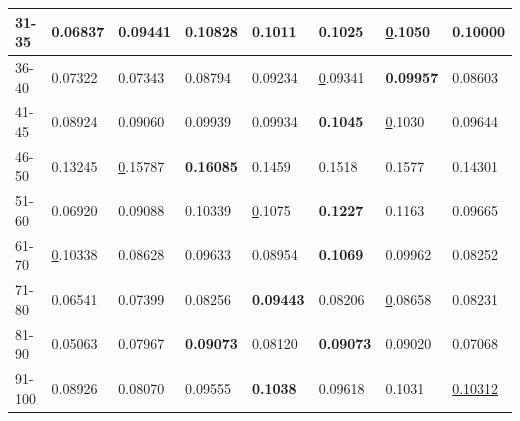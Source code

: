 \begin{table}[]
\begin{tabular}{|l|l|l|l|l|l|l||l|}
        31-35       & 0.06837                        & 0.09441                        & \textbf{0.10828}               & 0.1011                         & 0.1025                         & {\ul 0.1050}                    & 0.10000                    \\ \hline
        36-40       & 0.07322                        & 0.07343                        & 0.08794                        & 0.09234                        & {\ul 0.09341}                  & \textbf{0.09957}                & 0.08603                    \\ \hline
        41-45       & 0.08924                        & 0.09060                        & 0.09939                        & 0.09934                        & \textbf{0.1045}                & {\ul 0.1030}                    & 0.09644                    \\ \hline
        46-50       & 0.13245                        & {\ul 0.15787}                  & \textbf{0.16085}               & 0.1459                         & 0.1518                         & 0.1577                          & 0.14301                    \\ \hline
        51-60       & 0.06920                        & 0.09088                        & 0.10339                        & {\ul 0.1075}                   & \textbf{0.1227}                & 0.1163                          & 0.09665                    \\ \hline
        61-70       & {\ul 0.10338}                  & 0.08628                        & 0.09633                        & 0.08954                        & \textbf{0.1069}                & 0.09962                         & 0.08252                    \\ \hline
        71-80       & 0.06541                        & 0.07399                        & 0.08256                        & \textbf{0.09443}               & 0.08206                        & {\ul 0.08658}                   & 0.08231                    \\ \hline
        81-90       & 0.05063                        & 0.07967                        & \textbf{0.09073}               & 0.08120                        & \textbf{0.09073}               & 0.09020                         & 0.07068                    \\ \hline
        91-100      & 0.08926                        & 0.08070                        & 0.09555                        & \textbf{0.1038}                & 0.09618                        & 0.1031                          & \underline{0.10312}        \\ \hline

\end{tabular}
\end{table}
